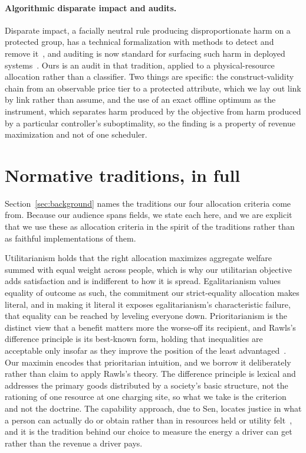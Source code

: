 \documentclass[manuscript, screen, review, anonymous]{acmart}
\begin{document}
\paragraph{Algorithmic disparate impact and audits.}
Disparate impact, a facially neutral rule producing disproportionate harm on a protected group, has a technical formalization with methods to detect and remove it~\cite{feldman2015certifying}, and auditing is now standard for surfacing such harm in deployed systems~\cite{barocas2023fairness}. Ours is an audit in that tradition, applied to a physical-resource allocation rather than a classifier. Two things are specific: the construct-validity chain from an observable price tier to a protected attribute, which we lay out link by link rather than assume, and the use of an exact offline optimum as the instrument, which separates harm produced by the objective from harm produced by a particular controller's suboptimality, so the finding is a property of revenue maximization and not of one scheduler.
\section{Normative traditions, in full}
\label{app:traditions}

Section~\ref{sec:background} names the traditions our four allocation criteria come from. Because our audience spans fields, we state each here, and we are explicit that we use these as allocation criteria in the spirit of the traditions rather than as faithful implementations of them.

Utilitarianism holds that the right allocation maximizes aggregate welfare summed with equal weight across people, which is why our utilitarian objective adds satisfaction and is indifferent to how it is spread. Egalitarianism values equality of outcome as such, the commitment our strict-equality allocation makes literal, and in making it literal it exposes egalitarianism's characteristic failure, that equality can be reached by leveling everyone down. Prioritarianism is the distinct view that a benefit matters more the worse-off its recipient, and Rawls's difference principle is its best-known form, holding that inequalities are acceptable only insofar as they improve the position of the least advantaged~\cite{rawls2017theory}. Our maximin encodes that prioritarian intuition, and we borrow it deliberately rather than claim to apply Rawls's theory. The difference principle is lexical and addresses the primary goods distributed by a society's basic structure, not the rationing of one resource at one charging site, so what we take is the criterion and not the doctrine. The capability approach, due to Sen, locates justice in what a person can actually do or obtain rather than in resources held or utility felt~\cite{sen2014development}, and it is the tradition behind our choice to measure the energy a driver can get rather than the revenue a driver pays.
\end{document}
